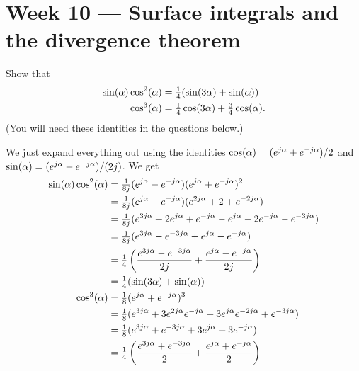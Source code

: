 \documentclass[a4paper]{amsart}
\renewenvironment{solution}{\SolutionInline}{\endSolutionInline}
\begin{document}
\section*{Week 10 --- Surface integrals and the divergence theorem}

\begin{exercise}
 Show that
 \begin{align*}
   \sin(\alpha)\cos^2(\alpha) &= \tfrac{1}{4}(\sin(3\alpha)+\sin(\alpha)) \\
   \cos^3(\alpha) &= \tfrac{1}{4}\cos(3\alpha)+\tfrac{3}{4}\cos(\alpha).
 \end{align*}
 (You will need these identities in the questions below.)
\end{exercise}
\begin{solution}
 We just expand everything out using the identities
 $\cos(\alpha)=(e^{j\alpha}+e^{-j\alpha})/2$ and
 $\sin(\alpha)=(e^{j\alpha}-e^{-j\alpha})/(2j)$.  We get 
 \begin{align*}
  \sin(\alpha)\cos^2(\alpha) 
   &= \tfrac{1}{8j}(e^{j\alpha}-e^{-j\alpha})(e^{j\alpha}+e^{-j\alpha})^2 \\
   &= \tfrac{1}{8j}(e^{j\alpha}-e^{-j\alpha})(e^{2j\alpha}+2+e^{-2j\alpha}) \\
   &= \tfrac{1}{8j}(e^{3j\alpha}+2e^{j\alpha}+e^{-j\alpha}
                   -e^{j\alpha}-2e^{-j\alpha}-e^{-3j\alpha}) \\
   &= \tfrac{1}{8j}(e^{3j\alpha}-e^{-3j\alpha}+e^{j\alpha}-e^{-j\alpha}) \\
   &= \tfrac{1}{4}\left(\frac{e^{3j\alpha}-e^{-3j\alpha}}{2j}+
                        \frac{e^{j\alpha}-e^{-j\alpha}}{2j}\right) \\
   &= \tfrac{1}{4}(\sin(3\alpha)+\sin(\alpha)) \\
  \cos^3(\alpha)
   &= \tfrac{1}{8}(e^{j\alpha}+e^{-j\alpha})^3 \\
   &= \tfrac{1}{8}(e^{3j\alpha} + 3 e^{2j\alpha}e^{-j\alpha}
                    + 3 e^{j\alpha}e^{-2j\alpha} + e^{-3j\alpha}) \\
   &= \tfrac{1}{8}(e^{3j\alpha}+e^{-3j\alpha}+3e^{j\alpha}+3e^{-j\alpha}) \\
   &= \tfrac{1}{4}\left(\frac{e^{3j\alpha}+e^{-3j\alpha}}{2} +
                        \frac{e^{j\alpha}+e^{-j\alpha}}{2}\right)
 \end{align*}
\end{solution}
\end{document}
